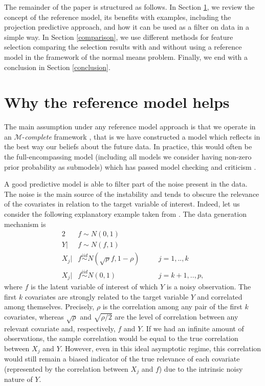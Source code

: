 \documentclass[american,]{article}
\theoremstyle{definition}
\begin{document}
The remainder of the paper is structured as follows. In Section
\ref{reference-model-approach}, we review the concept of the reference
model, its benefits with examples, including the projection predictive
approach, and how it can be used as a filter on data in a simple
way. In Section \ref{comparison}, we use different methods for feature
selection comparing the selection results with and without using a
reference model in the framework of the normal means problem. Finally,
we end with a conclusion in Section \ref{conclusion}.


\hypertarget{reference-model-approach}{%
\section{Why the reference model helps}\label{reference-model-approach}}

The main assumption under any reference model approach is that we
operate in an $\mathcal{M}$-\textit{complete} framework
\citep{book:bernardo_smith,vehtari2012survey}, that is we have constructed a
model which reflects in the best way our beliefs about the future
data. In practice, this would often be the full-encompassing model
(including all models we consider having non-zero prior
probability as submodels) which has passed model checking and criticism \citep[see,
e.g.][]{gelman2013bayesian}. 
 
A good predictive model is able to filter part of the noise present in
the data. The noise is the main source of the instability and tends to
obscure the relevance of the covariates in relation to the target
variable of interest. Indeed, let us consider the following
explanatory example taken from \cite{paper:projpred}. The data
generation mechanism is
\begin{alignat}{2} \label{eq:simulated_data}
     &f\sim N(0,1) && \nonumber \\ 
     Y|&f\sim N(f,1) && \\
     X_{j}|&f \overset{iid}{\sim} N(\sqrt{\rho}f,1-\rho) \quad &&j=1,..,k \nonumber \\
     X_{j}|&f \overset{iid}{\sim} N(0,1) &&j=k+1,..,p \nonumber,
\end{alignat}
where $f$ is the latent variable of interest of which $Y$ is a noisy
observation. The first $k$ covariates are strongly related to the
target variable $Y$ and correlated among themselves. Precisely, $\rho$
is the correlation among any pair of the first $k$ covariates, whereas
$\sqrt{\rho}$ and $\sqrt{\rho/2}$ are the level of correlation between
any relevant covariate and, respectively, $f$ and $Y$. If we had an
infinite amount of observations, the sample correlation would be equal
to the true correlation between $X_j$ and $Y$. However, even in this
ideal asymptotic regime, this correlation would still remain a biased
indicator of the true relevance of each covariate (represented by the
correlation between $X_j$ and $f$) due to the intrinsic noisy nature
of $Y$.
\end{document}
